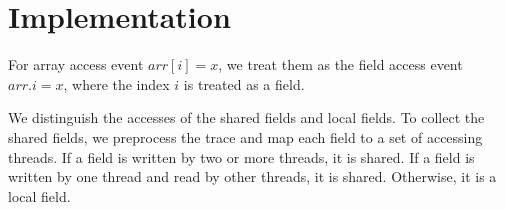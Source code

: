 \section{Implementation}\label{sec:impl}
For array access event $arr[i]=x$, we treat them as the field access event $arr.i=x$, where the index $i$ is treated as a field. 

We distinguish the accesses of the shared fields and local fields. To collect the shared fields, we preprocess the trace and map each field to a set of accessing threads. If a field is written by two or more threads, it is shared. If a field is written by one thread and read by other threads, it is shared. Otherwise, it is a local field. 
